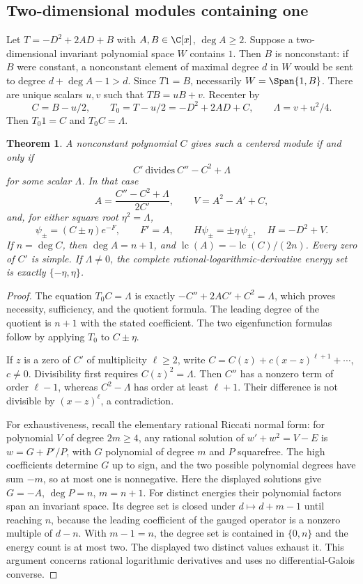 \documentclass[11pt,a4paper]{article}
\newtheorem{theorem}{Theorem}[section]
\theoremstyle{definition}\newtheorem{definition}[theorem]{Definition}
\theoremstyle{remark}\newtheorem{remark}[theorem]{Remark}
\numberwithin{equation}{section}
\begin{document}
\subsection{Two-dimensional modules containing one}\label{H05-sec-1}
Let $T=-D^2+2AD+B$ with $A,B\in\C[x]$, $\deg A\ge2$. Suppose a two-dimensional invariant polynomial space $W$ contains $1$. Then $B$ is nonconstant: if $B$ were constant, a nonconstant element of maximal degree $d$ in $W$ would be sent to degree $d+\deg A-1>d$. Since $T1=B$, necessarily $W=\Span\{1,B\}$. There are unique scalars $u,v$ such that $TB=uB+v$. Recenter by
\[C=B-u/2,\qquad T_0=T-u/2=-D^2+2AD+C,\qquad\Lambda=v+u^2/4.\]
Then $T_0 1=C$ and $T_0 C=\Lambda$.
\begin{theorem}\label{H05-general}
A nonconstant polynomial $C$ gives such a centered module if and only if
\begin{equation}\label{H05-div} C'\ \text{divides}\ C''-C^2+\Lambda
\end{equation}
for some scalar $\Lambda$. In that case
\begin{equation}\label{H05-drift}
A=\frac{C''-C^2+\Lambda}{2C'},\qquad
V=A^2-A'+C,
\end{equation}
and, for either square root $\eta^2=\Lambda$,
\[\psi_\pm=(C\pm\eta)e^{-F},\qquad F'=A,\qquad H\psi_\pm=\pm\eta\,\psi_\pm,
\quad H=-D^2+V.
\]
If $n=\deg C$, then $\deg A=n+1$, and $\operatorname{lc}(A)=-\operatorname{lc}(C)/(2n)$. Every zero of $C'$ is simple. If $\Lambda\ne0$, the complete rational-logarithmic-derivative energy set is exactly $\{-\eta,\eta\}$.
\end{theorem}
\begin{proof}
The equation $T_0C=\Lambda$ is exactly $-C''+2AC'+C^2=\Lambda$, which proves necessity, sufficiency, and the quotient formula. The leading degree of the quotient is $n+1$ with the stated coefficient. The two eigenfunction formulas follow by applying $T_0$ to $C\pm\eta$.

If $z$ is a zero of $C'$ of multiplicity $\ell\ge2$, write $C=C(z)+c(x-z)^{\ell+1}+\cdots$, $c\ne0$. Divisibility first requires $C(z)^2=\Lambda$. Then $C''$ has a nonzero term of order $\ell-1$, whereas $C^2-\Lambda$ has order at least $\ell+1$. Their difference is not divisible by $(x-z)^\ell$, a contradiction.

For exhaustiveness, recall the elementary rational Riccati normal form: for polynomial $V$ of degree $2m\ge4$, any rational solution of $w'+w^2=V-E$ is $w=G+P'/P$, with $G$ polynomial of degree $m$ and $P$ squarefree. The high coefficients determine $G$ up to sign, and the two possible polynomial degrees have sum $-m$, so at most one is nonnegative. Here the displayed solutions give $G=-A$, $\deg P=n$, $m=n+1$. For distinct energies their polynomial factors span an invariant space. Its degree set is closed under $d\mapsto d+m-1$ until reaching $n$, because the leading coefficient of the gauged operator is a nonzero multiple of $d-n$. With $m-1=n$, the degree set is contained in $\{0,n\}$ and the energy count is at most two. The displayed two distinct values exhaust it. This argument concerns rational logarithmic derivatives and uses no differential-Galois converse.
\end{proof}
\end{document}
